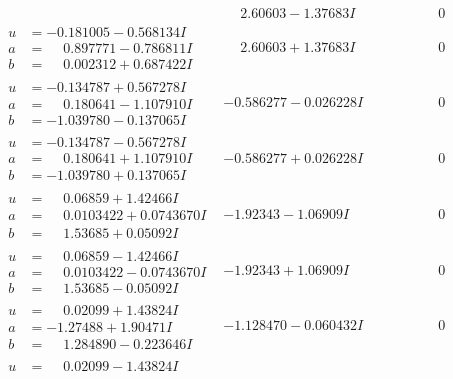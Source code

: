 \documentclass[1p]{elsarticle_modified}
\theoremstyle{definition}
\begin{document}
$$\begin{array}{c|c|c}
 & \phantom{-}2.60603 - 1.37683 I & \phantom{-0.000000 } 0 \\ \hline\begin{aligned}
u &= -0.181005 - 0.568134 I \\
a &= \phantom{-}0.897771 - 0.786811 I \\
b &= \phantom{-}0.002312 + 0.687422 I\end{aligned}
 & \phantom{-}2.60603 + 1.37683 I & \phantom{-0.000000 } 0 \\ \hline\begin{aligned}
u &= -0.134787 + 0.567278 I \\
a &= \phantom{-}0.180641 - 1.107910 I \\
b &= -1.039780 - 0.137065 I\end{aligned}
 & -0.586277 - 0.026228 I & \phantom{-0.000000 } 0 \\ \hline\begin{aligned}
u &= -0.134787 - 0.567278 I \\
a &= \phantom{-}0.180641 + 1.107910 I \\
b &= -1.039780 + 0.137065 I\end{aligned}
 & -0.586277 + 0.026228 I & \phantom{-0.000000 } 0 \\ \hline\begin{aligned}
u &= \phantom{-}0.06859 + 1.42466 I \\
a &= \phantom{-}0.0103422 + 0.0743670 I \\
b &= \phantom{-}1.53685 + 0.05092 I\end{aligned}
 & -1.92343 - 1.06909 I & \phantom{-0.000000 } 0 \\ \hline\begin{aligned}
u &= \phantom{-}0.06859 - 1.42466 I \\
a &= \phantom{-}0.0103422 - 0.0743670 I \\
b &= \phantom{-}1.53685 - 0.05092 I\end{aligned}
 & -1.92343 + 1.06909 I & \phantom{-0.000000 } 0 \\ \hline\begin{aligned}
u &= \phantom{-}0.02099 + 1.43824 I \\
a &= -1.27488 + 1.90471 I \\
b &= \phantom{-}1.284890 - 0.223646 I\end{aligned}
 & -1.128470 - 0.060432 I & \phantom{-0.000000 } 0 \\ \hline\begin{aligned}
u &= \phantom{-}0.02099 - 1.43824 I \\

\end{aligned}
\end{array}$$
\end{document}

